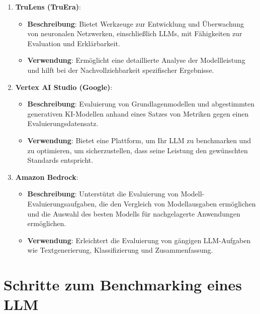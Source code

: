 \begin{enumerate}
    \item \textbf{TruLens (TruEra)}\cite{huang_evaluating_2024}:
    \begin{itemize}
        \item \textbf{Beschreibung}: Bietet Werkzeuge zur Entwicklung und Überwachung von neuronalen Netzwerken, einschließlich LLMs, mit Fähigkeiten zur Evaluation und Erklärbarkeit.
        \item \textbf{Verwendung}: Ermöglicht eine detaillierte Analyse der Modellleistung und hilft bei der Nachvollziehbarkeit spezifischer Ergebnisse.
    \end{itemize}
    
    \item \textbf{Vertex AI Studio (Google)}\cite{huang_evaluating_2024}:
    \begin{itemize}
        \item \textbf{Beschreibung}: Evaluierung von Grundlagenmodellen und abgestimmten generativen KI-Modellen anhand eines Satzes von Metriken gegen einen Evaluierungsdatensatz.
        \item \textbf{Verwendung}: Bietet eine Plattform, um Ihr LLM zu benchmarken und zu optimieren, um sicherzustellen, dass seine Leistung den gewünschten Standards entspricht.
    \end{itemize}
    
    \item \textbf{Amazon Bedrock}\cite{huang_evaluating_2024}:
    \begin{itemize}
        \item \textbf{Beschreibung}: Unterstützt die Evaluierung von Modell-Evaluierungsaufgaben, die den Vergleich von Modellausgaben ermöglichen und die Auswahl des besten Modells für nachgelagerte Anwendungen ermöglichen.
        \item \textbf{Verwendung}: Erleichtert die Evaluierung von gängigen LLM-Aufgaben wie Textgenerierung, Klassifizierung und Zusammenfassung.
    \end{itemize}
\end{enumerate} 

\section*{Schritte zum Benchmarking eines LLM}\cite{huang_evaluating_2024}

